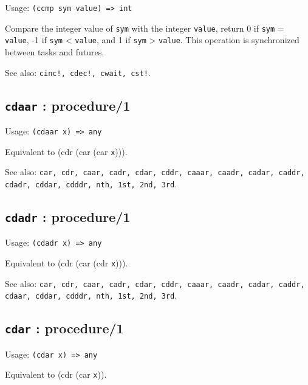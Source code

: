 \documentclass[
]{article}
\newcommand{\passthrough}[1]{#1}
\begin{document}
Usage: \passthrough{\lstinline!(ccmp sym value) => int!}

Compare the integer value of \passthrough{\lstinline!sym!} with the
integer \passthrough{\lstinline!value!}, return 0 if
\passthrough{\lstinline!sym!} = \passthrough{\lstinline!value!}, -1 if
\passthrough{\lstinline!sym!} \textless{}
\passthrough{\lstinline!value!}, and 1 if \passthrough{\lstinline!sym!}
\textgreater{} \passthrough{\lstinline!value!}. This operation is
synchronized between tasks and futures.

See also: \passthrough{\lstinline"cinc!, cdec!, cwait, cst!"}.

\hypertarget{cdaar-procedure1-1}{%
\subsection{\texorpdfstring{\texttt{cdaar} :
procedure/1}{cdaar : procedure/1}}\label{cdaar-procedure1-1}}

Usage: \passthrough{\lstinline!(cdaar x) => any!}

Equivalent to (cdr (car (car \passthrough{\lstinline!x!}))).

See also:
\passthrough{\lstinline!car, cdr, caar, cadr, cdar, cddr, caaar, caadr, cadar, caddr, cdadr, cddar, cdddr, nth, 1st, 2nd, 3rd!}.

\hypertarget{cdadr-procedure1-1}{%
\subsection{\texorpdfstring{\texttt{cdadr} :
procedure/1}{cdadr : procedure/1}}\label{cdadr-procedure1-1}}

Usage: \passthrough{\lstinline!(cdadr x) => any!}

Equivalent to (cdr (car (cdr \passthrough{\lstinline!x!}))).

See also:
\passthrough{\lstinline!car, cdr, caar, cadr, cdar, cddr, caaar, caadr, cadar, caddr, cdaar, cddar, cdddr, nth, 1st, 2nd, 3rd!}.

\hypertarget{cdar-procedure1-1}{%
\subsection{\texorpdfstring{\texttt{cdar} :
procedure/1}{cdar : procedure/1}}\label{cdar-procedure1-1}}

Usage: \passthrough{\lstinline!(cdar x) => any!}

Equivalent to (cdr (car \passthrough{\lstinline!x!})).
\end{document}
